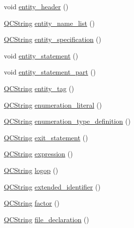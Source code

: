 \begin{DoxyCompactItemize}
\item 
void \hyperlink{classvhdl_1_1parser_1_1_vhdl_parser_a2b11731cbf8767887a46bcca9012fa72}{entity\+\_\+header} ()
\item 
\hyperlink{class_q_c_string}{Q\+C\+String} \hyperlink{classvhdl_1_1parser_1_1_vhdl_parser_ab13ff2a3ad9b852d8f511c0100498f36}{entity\+\_\+name\+\_\+list} ()
\item 
\hyperlink{class_q_c_string}{Q\+C\+String} \hyperlink{classvhdl_1_1parser_1_1_vhdl_parser_acdac062077f2a0456b77b7a925fc8e6d}{entity\+\_\+specification} ()
\item 
void \hyperlink{classvhdl_1_1parser_1_1_vhdl_parser_ae336b795493d5b0aa4113a0f829ea27f}{entity\+\_\+statement} ()
\item 
void \hyperlink{classvhdl_1_1parser_1_1_vhdl_parser_a5c08164de0412d93f6c27b493f20b942}{entity\+\_\+statement\+\_\+part} ()
\item 
\hyperlink{class_q_c_string}{Q\+C\+String} \hyperlink{classvhdl_1_1parser_1_1_vhdl_parser_a89735b148ec8f18cbd863e64f311600f}{entity\+\_\+tag} ()
\item 
\hyperlink{class_q_c_string}{Q\+C\+String} \hyperlink{classvhdl_1_1parser_1_1_vhdl_parser_ad5c72344304000947973aa5442354be8}{enumeration\+\_\+literal} ()
\item 
\hyperlink{class_q_c_string}{Q\+C\+String} \hyperlink{classvhdl_1_1parser_1_1_vhdl_parser_a527a7b41f5075bb471fadb939eafb246}{enumeration\+\_\+type\+\_\+definition} ()
\item 
\hyperlink{class_q_c_string}{Q\+C\+String} \hyperlink{classvhdl_1_1parser_1_1_vhdl_parser_a54242767cc83814938a62c170c483f0f}{exit\+\_\+statement} ()
\item 
\hyperlink{class_q_c_string}{Q\+C\+String} \hyperlink{classvhdl_1_1parser_1_1_vhdl_parser_a74c04bc4afae81a988995487c243bb5e}{expression} ()
\item 
\hyperlink{class_q_c_string}{Q\+C\+String} \hyperlink{classvhdl_1_1parser_1_1_vhdl_parser_a432e9b87bea3ef2491deb81d1c6f54a2}{logop} ()
\item 
\hyperlink{class_q_c_string}{Q\+C\+String} \hyperlink{classvhdl_1_1parser_1_1_vhdl_parser_a9041e97a245c42ce4ab20fd298c46547}{extended\+\_\+identifier} ()
\item 
\hyperlink{class_q_c_string}{Q\+C\+String} \hyperlink{classvhdl_1_1parser_1_1_vhdl_parser_a02399a64d60ef8301ae6fb1ad95b93ec}{factor} ()
\item 
\hyperlink{class_q_c_string}{Q\+C\+String} \hyperlink{classvhdl_1_1parser_1_1_vhdl_parser_a39801c0c74f80d5a1608ee41d9130dd6}{file\+\_\+declaration} ()

\end{DoxyCompactItemize}
